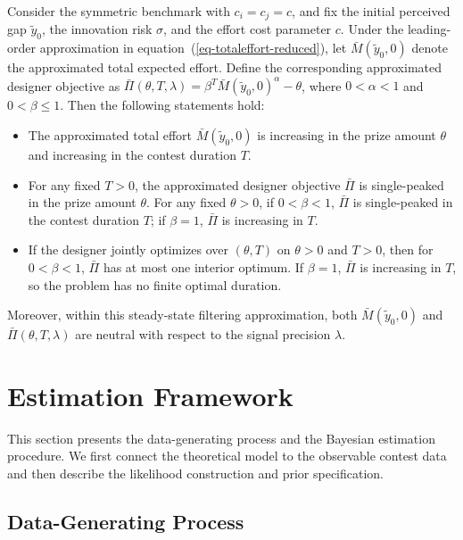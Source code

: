 \documentclass[mnsc]{informs3}
\begin{document}
\begin{proposition}\label{prop-monotonicity-M}
Consider the symmetric benchmark with $c_i=c_j=c$, and fix the initial perceived gap $\tilde y_0$, the innovation risk $\sigma$, and the effort cost parameter $c$.
Under the leading-order approximation in equation~(\ref{eq-totaleffort-reduced}), let $\bar M(\tilde y_0,0)$ denote the approximated total expected effort.
Define the corresponding approximated designer objective as $\bar\Pi(\theta,T,\lambda)=\beta^T \bar M(\tilde y_0,0)^\alpha-\theta$, where $0<\alpha<1$ and $0<\beta\leq 1$.
Then the following statements hold:
\begin{itemize}
	\item [(1)] The approximated total effort $\bar{M}(\tilde y_0,0)$ is increasing in the prize amount $\theta$ and increasing in the contest duration $T$.

	\item [(2)] For any fixed $T>0$, the approximated designer objective $\bar\Pi$ is single-peaked in the prize amount $\theta$. For any fixed $\theta>0$, if $0<\beta<1$, $\bar\Pi$ is single-peaked in the contest duration $T$; if $\beta=1$, $\bar\Pi$ is increasing in $T$.

    \item[(3)] If the designer jointly optimizes over $(\theta,T)$ on $\theta>0$ and $T>0$, then for $0<\beta<1$, $\bar\Pi$ has at most one interior optimum. If $\beta=1$, $\bar\Pi$ is increasing in $T$, so the problem has no finite optimal duration.
\end{itemize}
Moreover, within this steady-state filtering approximation, both $\bar M(\tilde y_0,0)$ and $\bar\Pi(\theta,T,\lambda)$ are neutral with respect to the signal precision $\lambda$.
\end{proposition}






\section{Estimation Framework}\label{sect-bayes-framework}

This section presents the data-generating process and the Bayesian estimation procedure.
We first connect the theoretical model to the observable contest data and then describe the likelihood construction and prior specification.

\subsection{Data-Generating Process}
\end{document}
